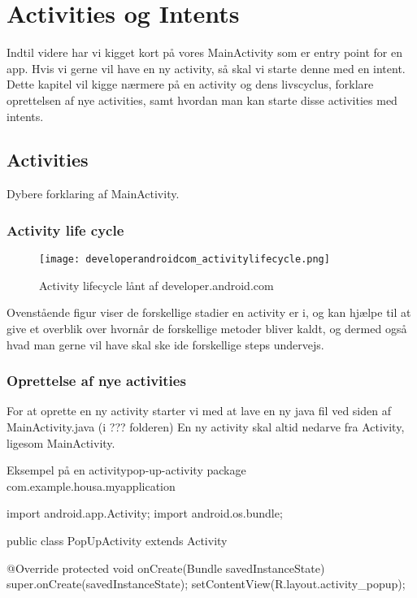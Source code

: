 \chapter{Activities og Intents}

Indtil videre har vi kigget kort på vores MainActivity som er entry point for en app. Hvis vi gerne vil have en ny activity, så skal vi starte denne med en intent. Dette kapitel vil kigge nærmere på en activity og dens livscyclus, forklare oprettelsen af nye activities, samt hvordan man kan starte disse activities med intents.

\section{Activities}

Dybere forklaring af MainActivity.

\subsection{Activity life cycle}

\begin{figure}[H]
	\begin{center}
		\texttt{[image: developerandroidcom\_activitylifecycle.png]}
		\caption{Activity lifecycle lånt af developer.android.com}
		\label{fig:android:activities:activitylifecycle}
	\end{center}
\end{figure}

Ovenstående figur viser de forskellige stadier en activity er i, og kan hjælpe til at give et overblik over hvornår de forskellige metoder bliver kaldt, og dermed også hvad man gerne vil have skal ske ide forskellige steps undervejs.

\subsection{Oprettelse af nye activities}

For at oprette en ny activity starter vi med at lave en ny java fil ved siden af MainActivity.java (i ??? folderen) En ny activity skal altid nedarve fra Activity, ligesom MainActivity. 

\begin{example}\noindent
	\begin{JavaCode}{Eksempel på en activity}{pop-up-activity}
		package com.example.housa.myapplication
		
		import android.app.Activity;
		import android.os.bundle;
		
		public class PopUpActivity extends Activity {
		  
		  @Override
		  protected void onCreate(Bundle savedInstanceState) {
		    super.onCreate(savedInstanceState);
		    setContentView(R.layout.activity_popup);
		  }
		}
	\end{JavaCode}
\end{example}

